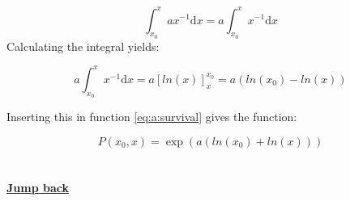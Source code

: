 \documentclass{article}
\numberwithin{equation}{section} %
\newcommand{\md}{\mathrm{d}}
\begin{document}
\begin{equation}
    \int_{x_0}^{x}ax^{-1}\md x = a\int_{x_0}^{x}x^{-1}\md x
\end{equation}
Calculating the integral yields:

\begin{equation}\label{hej}
    a\int_{x_0}^{x}x^{-1}\md x = a\left[ln(x) \right]_x^{x_0} = a(ln(x_0)-ln(x))
\end{equation}

Inserting this in function \ref{eq:a:survival} gives the function:

\begin{equation}
    P(x_0,x) = \exp({a(ln(x_0)+ln(x))})
\end{equation}
\\
\\
\textbf{\hyperref[jmp:a:survivalDerivation]{Jump back }}
\end{document}
